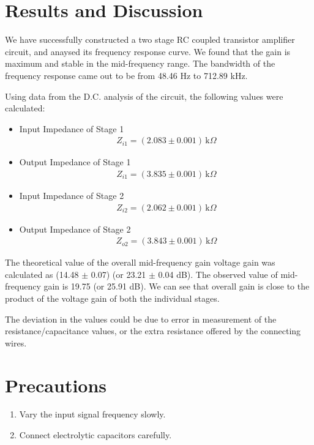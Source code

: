 \section{Results and Discussion}
We have successfully constructed a two stage RC coupled transistor amplifier circuit, and anaysed its frequency response curve. We found that the gain is maximum and stable in the mid-frequency range. The bandwidth of the frequency response came out to be from 48.46 Hz to 712.89 kHz.

Using data from the D.C. analysis of the circuit, the following values were calculated:

\begin{itemize}
    \item Input Impedance of Stage 1
        \begin{align*}
            Z_{i1} = (2.083 \pm 0.001)\,\text{k}\Omega
        \end{align*}
    \item Output Impedance of Stage 1
        \begin{align*}
            Z_{i1} = (3.835 \pm 0.001)\,\text{k}\Omega
        \end{align*}
    \item Input Impedance of Stage 2
        \begin{align*}
            Z_{i2} = (2.062 \pm 0.001)\,\text{k}\Omega
        \end{align*}
    \item Output Impedance of Stage 2
        \begin{align*}
            Z_{o2} = (3.843 \pm 0.001)\,\text{k}\Omega
        \end{align*}
\end{itemize}

The theoretical value of the overall mid-frequency gain voltage gain was calculated as (14.48 $\pm$ 0.07) (or 23.21 $\pm$ 0.04 dB). The observed value of mid-frequency gain is 19.75 (or 25.91 dB). We can see that overall gain is close to the product of the voltage gain of both the individual stages. 

The deviation in the values could be due to error in measurement of the resistance/capacitance values, or the extra resistance offered by the connecting wires.

\section{Precautions}
\begin{enumerate}
    \item Vary the input signal frequency slowly.
    \item Connect electrolytic capacitors carefully.
\end{enumerate}